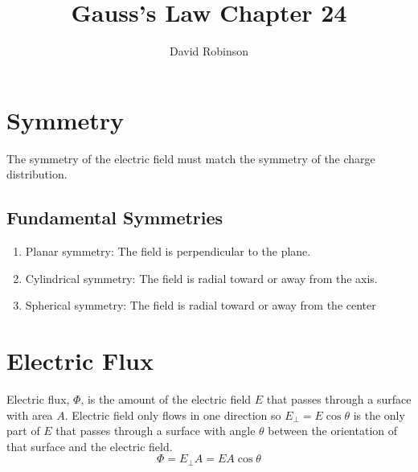 \documentclass{article}
\title{Gauss's Law Chapter 24}
\author{David Robinson}
\date{}
\begin{document}
\maketitle

\section*{Symmetry}
The symmetry of the electric field must match the symmetry of the charge distribution.

\subsection*{Fundamental Symmetries}
\begin{enumerate}
    \item Planar symmetry: The field is perpendicular to the plane.
    \item Cylindrical symmetry: The field is radial toward or away from the axis.
    \item Spherical symmetry: The field is radial toward or away from the center
\end{enumerate}

\section*{Electric Flux}
Electric flux, $\Phi$, is the amount of the electric field $E$ that passes through a surface with area $A$.
Electric field only flows in one direction so $E_\perp=E\cos\theta$ is the only part of $E$ that passes through a surface with angle $\theta$ between the orientation of that surface and the electric field.
\[\Phi = E_\perp A = EA\cos\theta\]
\end{document}
